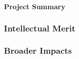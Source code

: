 
\begin{center}

{\bf \projecttitle}
\vspace{+2ex}
\\ \authors\\
\vspace{+1.5ex}
{{\bf Project Summary}} \\
\end{center}



\subsubsection*{Intellectual Merit}

\subsubsection*{Broader Impacts} 


\vspace{+3mm}








